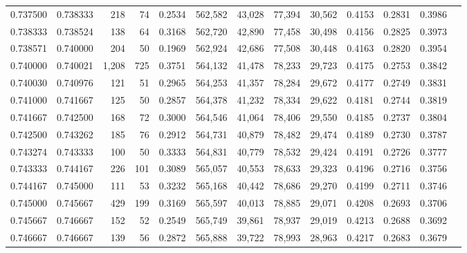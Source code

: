 \begin{tabular}{rrrrrrrrrrrrr}
0.737500 & 0.738333 &   218 &  74 &                                     0.2534 & 562,582 &  43,028 &  77,394 &  30,562 & 0.4153 & 0.2831 & 0.3986 \\
0.738333 & 0.738524 &   138 &  64 &                                     0.3168 & 562,720 &  42,890 &  77,458 &  30,498 & 0.4156 & 0.2825 & 0.3973 \\
0.738571 & 0.740000 &   204 &  50 &                                     0.1969 & 562,924 &  42,686 &  77,508 &  30,448 & 0.4163 & 0.2820 & 0.3954 \\
0.740000 & 0.740021 & 1,208 & 725 &                                     0.3751 & 564,132 &  41,478 &  78,233 &  29,723 & 0.4175 & 0.2753 & 0.3842 \\
0.740030 & 0.740976 &   121 &  51 &                                     0.2965 & 564,253 &  41,357 &  78,284 &  29,672 & 0.4177 & 0.2749 & 0.3831 \\
0.741000 & 0.741667 &   125 &  50 &                                     0.2857 & 564,378 &  41,232 &  78,334 &  29,622 & 0.4181 & 0.2744 & 0.3819 \\
0.741667 & 0.742500 &   168 &  72 &                                     0.3000 & 564,546 &  41,064 &  78,406 &  29,550 & 0.4185 & 0.2737 & 0.3804 \\
0.742500 & 0.743262 &   185 &  76 &                                     0.2912 & 564,731 &  40,879 &  78,482 &  29,474 & 0.4189 & 0.2730 & 0.3787 \\
0.743274 & 0.743333 &   100 &  50 &                                     0.3333 & 564,831 &  40,779 &  78,532 &  29,424 & 0.4191 & 0.2726 & 0.3777 \\
0.743333 & 0.744167 &   226 & 101 &                                     0.3089 & 565,057 &  40,553 &  78,633 &  29,323 & 0.4196 & 0.2716 & 0.3756 \\
0.744167 & 0.745000 &   111 &  53 &                                     0.3232 & 565,168 &  40,442 &  78,686 &  29,270 & 0.4199 & 0.2711 & 0.3746 \\
0.745000 & 0.745667 &   429 & 199 &                                     0.3169 & 565,597 &  40,013 &  78,885 &  29,071 & 0.4208 & 0.2693 & 0.3706 \\
0.745667 & 0.746667 &   152 &  52 &                                     0.2549 & 565,749 &  39,861 &  78,937 &  29,019 & 0.4213 & 0.2688 & 0.3692 \\
0.746667 & 0.746667 &   139 &  56 &                                     0.2872 & 565,888 &  39,722 &  78,993 &  28,963 & 0.4217 & 0.2683 & 0.3679 \\

\end{tabular}
